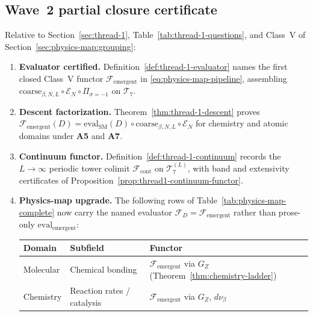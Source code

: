 \subsection{Wave~2 partial closure certificate}
\label{sec:wave2-thread1:closure}

\begin{corollary}
\label{cor:thread-1-wave2-partial}
Relative to Section~\ref{sec:thread-1}, Table~\ref{tab:thread-1-questions},
and Class~V of Section~\ref{sec:physics-map:grouping}:
\begin{enumerate}[label=(\roman*),leftmargin=*]
  \item \textbf{Evaluator certified.}
    Definition~\ref{def:thread-1-evaluator} names the first closed Class~V
    functor $\mathcal{F}_{\mathrm{emergent}}$ in
    \eqref{eq:physics-map-pipeline}, assembling
    $\mathrm{coarse}_{\beta,N,L}\circ\mathcal{E}_N\circ\Pi_{\sigma=-1}$ on
    $\mathcal{T}_7$.
  \item \textbf{Descent factorization.}
    Theorem~\ref{thm:thread-1-descent} proves
    $\mathcal{F}_{\mathrm{emergent}}(D)=\mathrm{eval}_{\mathrm{SM}}(D)\circ
    \mathrm{coarse}_{\beta,N,L}\circ\mathcal{E}_N$ for chemistry and atomic
    domains under \textbf{A5} and \textbf{A7}.
  \item \textbf{Continuum functor.}
    Definition~\ref{def:thread-1-continuum} records the $L\to\infty$ periodic
    tower colimit $\mathcal{F}_{\mathrm{cont}}$ on
    $\mathcal{T}_7^{(L)}$, with band and extensivity certificates of
    Proposition~\ref{prop:thread1-continuum-functor}.
  \item \textbf{Physics-map upgrade.}
    The following rows of Table~\ref{tab:physics-map-complete} now carry the
    named evaluator $\mathcal{F}_D=\mathcal{F}_{\mathrm{emergent}}$ rather than
    prose-only $\mathrm{eval}_{\mathrm{emergent}}$:
    \begin{center}
    \small
    \renewcommand{\arraystretch}{1.08}
    \begin{tabular}{@{}lll@{}}
    \toprule
    \textbf{Domain} & \textbf{Subfield} & \textbf{Functor} \\
    \midrule
    Molecular & Chemical bonding &
      $\mathcal{F}_{\mathrm{emergent}}$ via $G_Z$
      (Theorem~\ref{thm:chemistry-ladder}) \\
    Chemistry & Reaction rates / catalysis &
      $\mathcal{F}_{\mathrm{emergent}}$ via $G_Z$, $d\nu_\beta$ \\

\end{tabular}
\end{center}
\end{enumerate}
\end{corollary}
